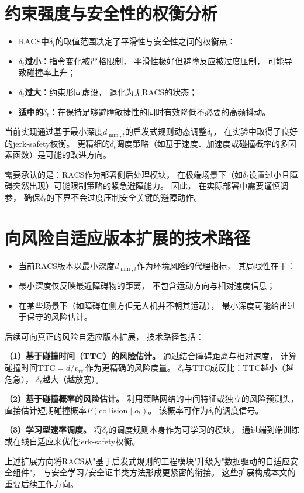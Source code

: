 \section{约束强度与安全性的权衡分析}

\begin{itemize}
\item RACS中$\delta_t$的取值范围决定了平滑性与安全性之间的权衡点：
\item \textbf{$\delta_t$过小}：指令变化被严格限制，
平滑性极好但避障反应被过度压制，
可能导致碰撞率上升；
 \item \textbf{$\delta_t$过大}：约束形同虚设，
退化为无RACS的状态；
 \item \textbf{适中的$\delta_t$}：在保持足够避障敏捷性的同时有效降低不必要的高频抖动。
 \end{itemize}

当前实现通过基于最小深度$d_{\min,t}$的启发式规则动态调整$\delta_t$，
在实验中取得了良好的jerk-safety权衡。
更精细的$\delta_t$调度策略（如基于速度、加速度或碰撞概率的多因素函数）是可能的改进方向。

需要承认的是：RACS作为部署侧后处理模块，
在极端场景下（如$\delta_t$设置过小且障碍突然出现）可能限制策略的紧急避障能力。
因此，
在实际部署中需要谨慎调参，
确保$\delta_t$的下界不会过度压制安全关键的避障动作。


\section{向风险自适应版本扩展的技术路径}

\begin{itemize}
\item 当前RACS版本以最小深度$d_{\min,t}$作为环境风险的代理指标，
其局限性在于：
\item 最小深度仅反映最近障碍物的距离，
不包含运动方向与相对速度信息；
 \item 在某些场景下（如障碍在侧方但无人机并不朝其运动），
最小深度可能给出过于保守的风险估计。
 \end{itemize}

后续可向真正的风险自适应版本扩展，
技术路径包括：

\textbf{（1）基于碰撞时间（TTC）的风险估计。
} 通过结合障碍距离与相对速度，
计算碰撞时间$\text{TTC} = d / v_{\text{rel}}$作为更精确的风险度量。
$\delta_t$与TTC成反比：TTC越小（越危急），
$\delta_t$越大（越放宽）。

\textbf{（2）基于碰撞概率的风险估计。
} 利用策略网络的中间特征或独立的风险预测头，
直接估计短期碰撞概率$P(\text{collision} \mid o_t)$。
该概率可作为$\delta_t$的调度信号。

\textbf{（3）学习型速率调度。
} 将$\delta_t$的调度规则本身作为可学习的模块，
通过端到端训练或在线自适应来优化jerk-safety权衡。

上述扩展方向将RACS从"基于启发式规则的工程模块"升级为"数据驱动的自适应安全组件"，
与安全学习/安全证书类方法形成更紧密的衔接。
这些扩展构成本文的重要后续工作方向。
